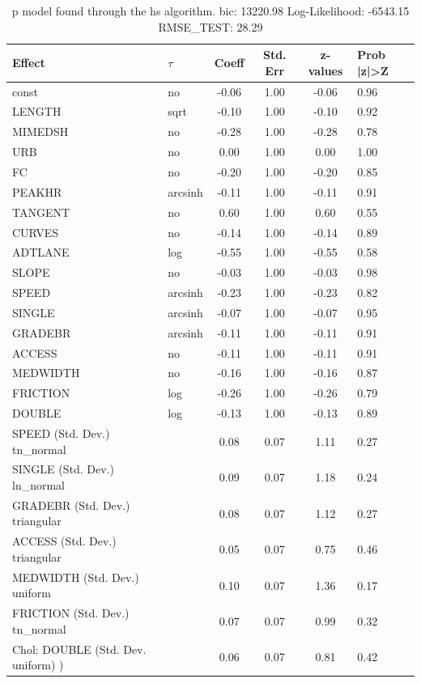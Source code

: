 \begin{table}
	\caption{p model found through the hs algorithm. bic: 13220.98 Log-Likelihood: -6543.15 RMSE_TEST: 28.29}
	\begin{center}
		\begin{tabular}{|l|l|c|c|c|l|}
			\hline
			Effect & $\tau$ & Coeff & Std. Err & z-values & Prob |z|>Z \\
			\hline
			const & no & -0.06 & 1.00 & -0.06 & 0.96 \\
			\hline
			LENGTH & sqrt & -0.10 & 1.00 & -0.10 & 0.92 \\
			\hline
			MIMEDSH & no & -0.28 & 1.00 & -0.28 & 0.78 \\
			\hline
			URB & no & 0.00 & 1.00 & 0.00 & 1.00 \\
			\hline
			FC & no & -0.20 & 1.00 & -0.20 & 0.85 \\
			\hline
			PEAKHR & arcsinh & -0.11 & 1.00 & -0.11 & 0.91 \\
			\hline
			TANGENT & no & 0.60 & 1.00 & 0.60 & 0.55 \\
			\hline
			CURVES & no & -0.14 & 1.00 & -0.14 & 0.89 \\
			\hline
			ADTLANE & log & -0.55 & 1.00 & -0.55 & 0.58 \\
			\hline
			SLOPE & no & -0.03 & 1.00 & -0.03 & 0.98 \\
			\hline
			SPEED & arcsinh & -0.23 & 1.00 & -0.23 & 0.82 \\
			\hline
			SINGLE & arcsinh & -0.07 & 1.00 & -0.07 & 0.95 \\
			\hline
			GRADEBR & arcsinh & -0.11 & 1.00 & -0.11 & 0.91 \\
			\hline
			ACCESS & no & -0.11 & 1.00 & -0.11 & 0.91 \\
			\hline
			MEDWIDTH & no & -0.16 & 1.00 & -0.16 & 0.87 \\
			\hline
			FRICTION & log & -0.26 & 1.00 & -0.26 & 0.79 \\
			\hline
			DOUBLE & log & -0.13 & 1.00 & -0.13 & 0.89 \\
			\hline
			SPEED (Std. Dev.) tn_normal &  & 0.08 & 0.07 & 1.11 & 0.27 \\
			\hline
			SINGLE (Std. Dev.) ln_normal &  & 0.09 & 0.07 & 1.18 & 0.24 \\
			\hline
			GRADEBR (Std. Dev.) triangular &  & 0.08 & 0.07 & 1.12 & 0.27 \\
			\hline
			ACCESS (Std. Dev.) triangular &  & 0.05 & 0.07 & 0.75 & 0.46 \\
			\hline
			MEDWIDTH (Std. Dev.) uniform &  & 0.10 & 0.07 & 1.36 & 0.17 \\
			\hline
			FRICTION (Std. Dev.) tn_normal &  & 0.07 & 0.07 & 0.99 & 0.32 \\
			\hline
			 Chol: DOUBLE (Std. Dev. uniform) ) &  & 0.06 & 0.07 & 0.81 & 0.42 \\
			\hline
		\end{tabular}
	\end{center}
\end{table}